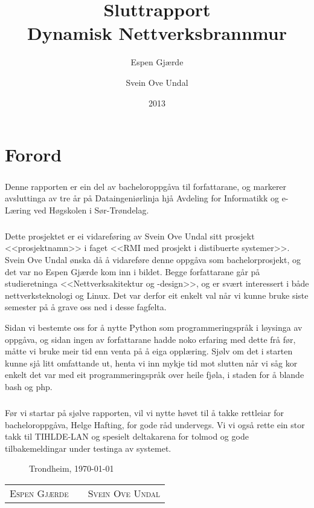 \documentclass[nynorsk,12pt,a4paper,oneside]{book}
\title{Sluttrapport \\ Dynamisk Nettverksbrannmur}
\author{Espen Gjærde \and Svein Ove Undal}
\date{2013}
\begin{document}

\frontmatter
\maketitle
\chapter{Forord}
\paragraph*{}
Denne rapporten er ein del av bacheloroppgåva til forfattarane, og markerer avsluttinga av tre år på Dataingeniørlinja hjå Avdeling for Informatikk og e-Læring ved Høgskolen i Sør-Trøndelag. 
\paragraph*{}
Dette prosjektet er ei vidareføring av Svein Ove Undal sitt prosjekt <<prosjektnamn>> i faget <<RMI med prosjekt i distibuerte systemer>>. Svein Ove Undal ønska då å vidareføre denne oppgåva som bachelorprosjekt, og det var no Espen Gjærde kom inn i bildet. Begge forfattarane går på studieretninga <<Nettverksakitektur og -design>>, og er svært interessert i både nettverksteknologi og Linux. Det var derfor eit enkelt val når vi kunne bruke siste semester på å grave oss ned i desse fagfelta. 

Sidan vi bestemte oss for å nytte Python som programmeringspråk i løysinga av oppgåva, og sidan ingen av forfattarane hadde noko erfaring med dette frå før, måtte vi bruke meir tid enn venta på å eiga opplæring. Sjølv om det i starten kunne sjå litt omfattande ut, henta vi inn mykje tid mot slutten når vi såg kor enkelt det var med eit programmeringspråk over heile fjøla, i staden for å blande bash og php. 

\paragraph*{}
Før vi startar på sjølve rapporten, vil vi nytte høvet til å takke rettleiar for bacheloroppgåva, Helge Hafting, for gode råd undervegs. Vi vi også rette ein stor takk til TIHLDE-LAN og spesielt deltakarena for tolmod og gode tilbakemeldingar under testinga av systemet. 
 
\begin{figure}[b]
Trondheim, \today \\
\vspace{1cm}
\end{figure}
\begin{table}[b!]
	\centering
	\begin{tabular}[c]{ c p{4cm} c } 
		\cline{1-1} \cline{3-3}
		\parbox{5cm}{\centering \textsc{Espen Gjærde}}
		& & 
		\parbox{5cm}{\centering \textsc{Svein Ove Undal}} \\
	\end{tabular}
\end{table}
\end{document}
